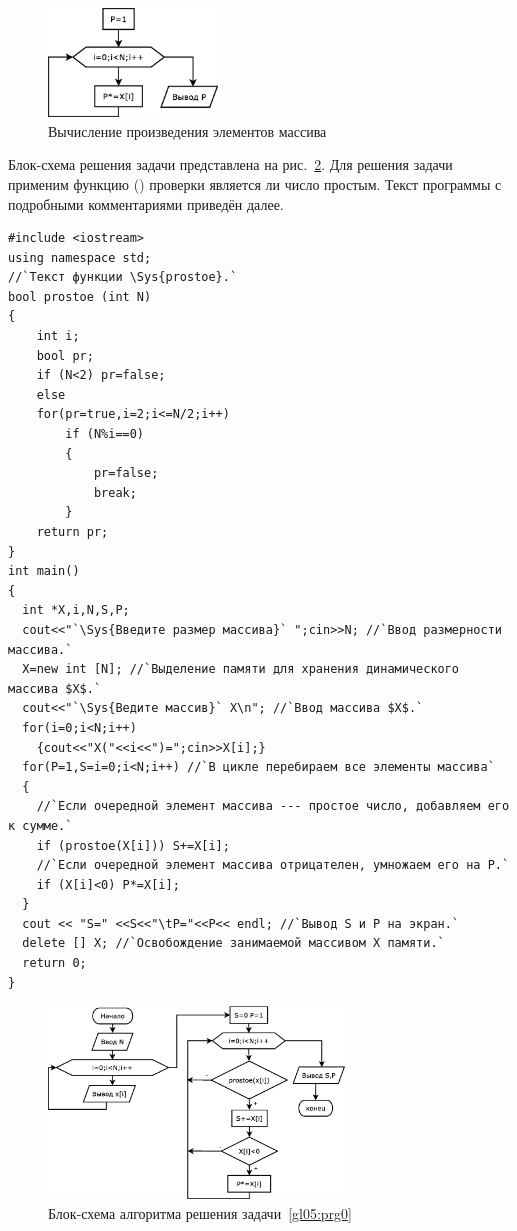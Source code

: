 \begin{figure}[htb]
\begin{center}
\includegraphics[width=0.4\textwidth]{img/ris_5_5}
\caption{Вычисление произведения элементов массива}
\label{ch05:refDrawing4}
\end{center}
\end{figure}

Блок-схема решения задачи представлена на рис.~\ref{ch05:refDrawing5}. 
Для решения задачи применим функцию ()
проверки является ли число простым. Текст программы с подробными комментариями приведён далее.
\begin{lstlisting}
#include <iostream>
using namespace std;
//`Текст функции \Sys{prostoe}.`
bool prostoe (int N)
{
    int i;
    bool pr;
    if (N<2) pr=false;
    else
    for(pr=true,i=2;i<=N/2;i++)
        if (N%i==0)
        {
            pr=false;
            break;
        }
    return pr;
}
int main()
{
  int *X,i,N,S,P;
  cout<<"`\Sys{Введите размер массива}` ";cin>>N; //`Ввод размерности массива.`
  X=new int [N]; //`Выделение памяти для хранения динамического массива $X$.`
  cout<<"`\Sys{Ведите массив}` X\n"; //`Ввод массива $X$.`
  for(i=0;i<N;i++)
    {cout<<"X("<<i<<")=";cin>>X[i];}
  for(P=1,S=i=0;i<N;i++) //`В цикле перебираем все элементы массива`
  {
    //`Если очередной элемент массива --- простое число, добавляем его к сумме.`
    if (prostoe(X[i])) S+=X[i];
    //`Если очередной элемент массива отрицателен, умножаем его на P.`
    if (X[i]<0) P*=X[i];
  }
  cout << "S=" <<S<<"\tP="<<P<< endl; //`Вывод S и P на экран.`
  delete [] X; //`Освобождение занимаемой массивом X памяти.`
  return 0;
}
\end{lstlisting}

\begin{figure}[h]
\begin{center}
\includegraphics[width=0.7\textwidth]{img/ris_5_6}
\caption{Блок-схема алгоритма решения задачи~\ref{gl05:prg0}}
\label{ch05:refDrawing5}
\end{center}
\end{figure}

